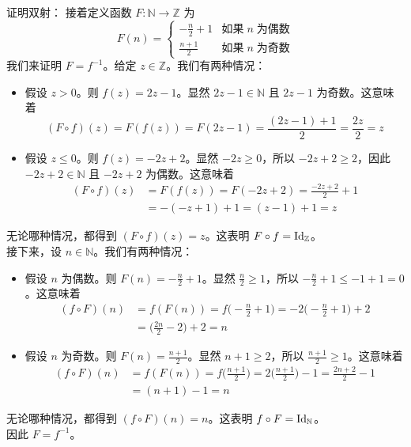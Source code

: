 \begin{example}
\begin{proofs}{证明双射：}
        接着定义函数 $F : \mathbb{N} \to \mathbb{Z}$ 为
        \[F(n) = \begin{cases}
                -\frac{n}{2} + 1 & \text{如果}\; n \;\text{为偶数} \\
                \frac{n+1}{2}    & \text{如果}\; n \;\text{为奇数}
            \end{cases}\]
        我们来证明 $F=f^{-1}$。给定 $z \in \mathbb{Z}$。我们有两种情况：
        \begin{itemize}
            \item 假设 $z > 0$。则 $f(z)=2z-1$。显然 $2z-1 \in \mathbb{N}$ 且 $2z-1$ 为奇数。这意味着
                  \[(F \circ f)(z) = F(f(z)) = F(2z - 1) = \frac{(2z-1)+1}{2} = \frac{2z}{2} = z\]
            \item 假设 $z \le 0$。则 $f(z)=-2z+2$。显然 $-2z \ge 0$，所以 $-2z + 2 \ge 2$，因此 $-2z + 2 \in \mathbb{N}$ 且 $-2z + 2$ 为偶数。这意味着
                  \begin{align*}
                      (F \circ f)(z) & = F(f(z)) = F(-2z + 2) = \frac{-2z + 2}{2}+1 \\
                                     & = -(-z + 1) + 1 = (z - 1) + 1 = z
                  \end{align*}
        \end{itemize}
        无论哪种情况，都得到 $(F \circ f)(z) = z$。这表明 $F \circ f = \text{Id}_{\mathbb{Z}}$。\\

        接下来，设 $n \in \mathbb{N}$。我们有两种情况：
        \begin{itemize}
            \item 假设 $n$ 为偶数。则 $F(n) = -\frac{n}{2} + 1$。显然 $\frac{n}{2} \ge 1$，所以 $-\frac{n}{2} + 1 \le -1+1=0$。这意味着
                  \begin{align*}
                      (f \circ F)(n) & = f(F(n)) = f\Big(-\frac{n}{2}+1\Big) = -2\Big(-\frac{n}{2}+1\Big)+2 \\
                                     & = \Big(\frac{2n}{2}-2\Big)+2=n
                  \end{align*}
            \item 假设 $n$ 为奇数。则 $F(n) = \frac{n+1}{2}$。显然 $n+1 \ge 2$，所以 $\frac{n+1}{2} \ge 1$。这意味着
                  \begin{align*}
                      (f \circ F)(n) & = f(F(n)) = f\Big(\frac{n+1}{2}\Big) = 2(\frac{n+1}{2}\Big)-1 = \frac{2n+2}{2}-1 \\
                                     & = (n + 1) -1 = n
                  \end{align*}
        \end{itemize}
        无论哪种情况，都得到 $(f \circ F)(n) = n$。这表明 $f \circ F = \text{Id}_{\mathbb{N}}$。\\

        因此 $F = f^{-1}$。
    \end{proofs}
\end{example}

